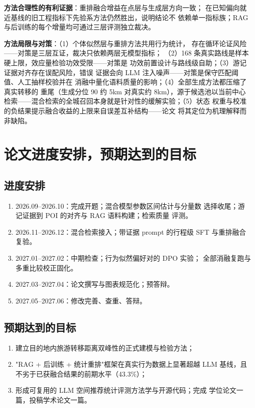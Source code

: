 \textbf{方法合理性的有利证据}：重排融合增益在点层与生成层方向一致；
在已知偏向就近基线的旧工程指标下先验系方法仍然胜出，说明结论不
依赖单一指标族；RAG 与后训练的每个增量均可通过三层评测独立裁决。

\textbf{方法局限与对策}：（1）个体似然层与重排方法共用行为统计，
存在循环论证风险——对策是三层互证，裁决只依赖两层无模型指标；
（2）168 条真实路线是样本硬上限，效应量检验功效受限——对策是
功效前置设计与路线级自助；（3）游记证据对齐存在误配风险，错误
证据会向 LLM 注入噪声——对策是保守匹配阈值、人工抽样校验并在
消融中量化语料质量的影响；（4）全部生成方法都压缩了真实转移的
重尾（生成分位 90 约 5km 对真实约 8km），源于候选池以当前中心
检索——混合检索的全城召回本身就是针对性的缓解实验；（5）状态
权重与校准的负结果提示融合收益的上限来自误差互补结构——论文
将其定位为机理解释而非缺陷。

\section{论文进度安排，预期达到的目标}

\subsection{进度安排}

\begin{enumerate}
  \item 2026.09--2026.10：完成开题；混合模型参数区间估计与分量数
        选择收尾；游记证据到 POI 的对齐与 RAG 语料构建；检索质量
        评测。
  \item 2026.11--2026.12：混合检索接入；带证据 prompt 的行程级
        SFT 与重排融合复验。
  \item 2027.01--2027.02：中期检查；行为似然偏好对的 DPO 实验；
        全部消融复跑与多重比较校正固化。
  \item 2027.03--2027.04：论文撰写与图表规范化；预答辩。
  \item 2027.05--2027.06：修改完善、查重、答辩。
\end{enumerate}

\subsection{预期达到的目标}

\begin{enumerate}
  \item 建立目的地内旅游转移距离双峰性的正式建模与检验方法；
  \item "RAG + 后训练 + 统计重排"框架在真实行为数据上显著超越
        LLM 基线，且不劣于已获融合结果的前期水平（43.3\%）；
  \item 形成可复用的 LLM 空间推荐统计评测方法学与开源代码；完成
        学位论文一篇，投稿学术论文一篇。
\end{enumerate}

